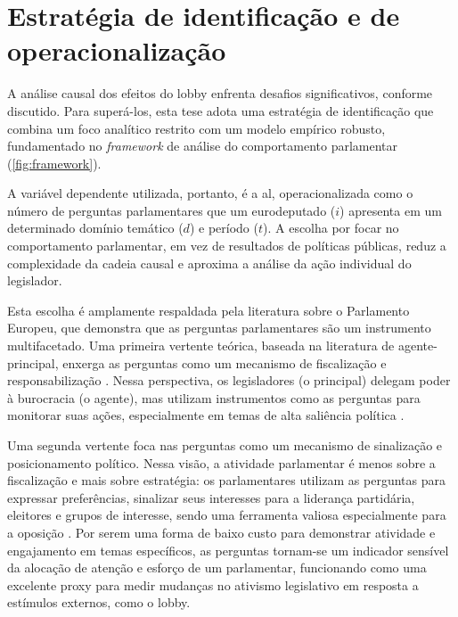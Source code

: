 \section{Estratégia de identificação e de operacionalização}

A análise causal dos efeitos do lobby enfrenta desafios significativos, conforme discutido. Para superá-los, esta tese adota uma estratégia de identificação que combina um foco analítico restrito com um modelo empírico robusto, fundamentado no \textit{framework} de análise do comportamento parlamentar (\ref{fig:framework}).

A variável dependente utilizada, portanto, é a \acrfull{al}, operacionalizada como o número de perguntas parlamentares que um eurodeputado ($i$) apresenta em um determinado domínio temático ($d$) e período ($t$). A escolha por focar no comportamento parlamentar, em vez de resultados de políticas públicas, reduz a complexidade da cadeia causal e aproxima a análise da ação individual do legislador.

Esta escolha é amplamente respaldada pela literatura sobre o Parlamento Europeu, que demonstra que as perguntas parlamentares são um instrumento multifacetado. Uma primeira vertente teórica, baseada na literatura de agente-principal, enxerga as perguntas como um mecanismo de fiscalização e responsabilização \cite{jensen2013parliamentary, maricut2020qa, martin2013parliamentary}. Nessa perspectiva, os legisladores (o principal) delegam poder à burocracia (o agente), mas utilizam instrumentos como as perguntas para monitorar suas ações, especialmente em temas de alta saliência política \cite{mccubbin1984congressional, saalfeld2000members, strom2000delegation, koop2011explaining}. 

Uma segunda vertente foca nas perguntas como um mecanismo de sinalização e posicionamento político. Nessa visão, a atividade parlamentar é menos sobre a fiscalização e mais sobre estratégia: os parlamentares utilizam as perguntas para expressar preferências, sinalizar seus interesses para a liderança partidária, eleitores e grupos de interesse, sendo uma ferramenta valiosa especialmente para a oposição \cite{martin2013parliamentary, otjes2017parliamentary, proksch2010parliamentary, bevan2023do, navarro2022banking}. Por serem uma forma de baixo custo para demonstrar atividade e engajamento em temas específicos, as perguntas tornam-se um indicador sensível da alocação de atenção e esforço de um parlamentar, funcionando como uma excelente proxy para medir mudanças no ativismo legislativo em resposta a estímulos externos, como o lobby.

